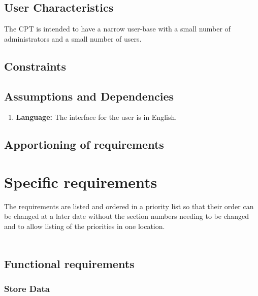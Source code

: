 \documentclass[12pt]{article}
\begin{document}
\subsection{User Characteristics}
The CPT is intended to have a narrow user-base with a small number of administrators and a small number of users.

\subsection{Constraints}


\subsection{Assumptions and Dependencies}
\begin{enumerate}
\item \textbf{Language:} The interface for the user is in English.
\end{enumerate}

\subsection{Apportioning of requirements}

\section{Specific requirements}
The requirements are listed and ordered in a priority list so that their order can be changed at a later date without the section numbers needing to be changed and to allow listing of the priorities in one location.\\
\\

\begin{comment}
The first 2 are to be considered absolutely critical. The software cannot be considered useful if those features are absent.

What are the security implications of storing identifiable time sheet info for employees??
\end{comment}

\subsection{Functional requirements}
 
\subsubsection{Store Data}\label{sec:Store Data}
\end{document}

